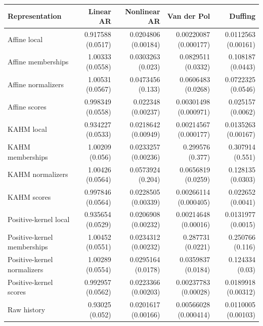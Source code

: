 \begin{tabular}{lrrrr}
\toprule
Representation & Linear AR & Nonlinear AR & Van der Pol & Duffing \\
\midrule
Affine local & 0.917588 (0.0517) & 0.0204806 (0.00184) & 0.00220087 (0.000177) & 0.0112563 (0.00161) \\
Affine memberships & 1.00333 (0.0558) & 0.0303263 (0.023) & 0.0829511 (0.0332) & 0.108187 (0.0443) \\
Affine normalizers & 1.00531 (0.0567) & 0.0473456 (0.133) & 0.0606483 (0.0268) & 0.0722325 (0.0546) \\
Affine scores & 0.998349 (0.0558) & 0.022348 (0.00237) & 0.00301498 (0.000971) & 0.025157 (0.0062) \\
KAHM local & 0.934227 (0.0533) & 0.0218642 (0.00949) & 0.00214567 (0.000177) & 0.0135263 (0.00167) \\
KAHM memberships & 1.00209 (0.056) & 0.0233257 (0.00236) & 0.299576 (0.377) & 0.307914 (0.551) \\
KAHM normalizers & 1.00426 (0.0564) & 0.0573924 (0.204) & 0.0656819 (0.0259) & 0.128135 (0.0303) \\
KAHM scores & 0.997846 (0.0564) & 0.0228505 (0.00339) & 0.00266114 (0.000405) & 0.022652 (0.0041) \\
Positive-kernel local & 0.935654 (0.0529) & 0.0206908 (0.00232) & 0.00214648 (0.00016) & 0.0131977 (0.0015) \\
Positive-kernel memberships & 1.00452 (0.0551) & 0.0234312 (0.00232) & 0.287731 (0.0221) & 0.250766 (0.116) \\
Positive-kernel normalizers & 1.00289 (0.0554) & 0.0295164 (0.0178) & 0.0359837 (0.0184) & 0.124334 (0.03) \\
Positive-kernel scores & 0.992957 (0.0562) & 0.0223366 (0.00203) & 0.00237783 (0.00028) & 0.0189918 (0.00312) \\
Raw history & 0.93025 (0.052) & 0.0201617 (0.00166) & 0.00566028 (0.000414) & 0.0110005 (0.00103) \\
\bottomrule
\end{tabular}
